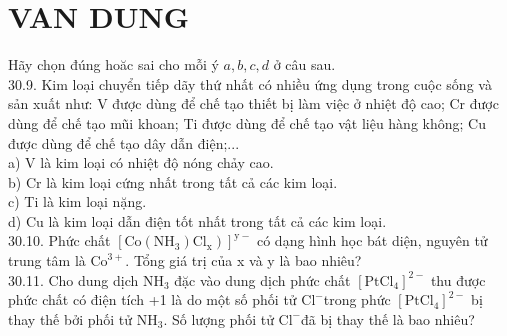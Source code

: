 \documentclass[10pt]{article}
\begin{document}
\section*{VAN DUNG}
Hãy chọn đúng hoăc sai cho mỗi ý $a, b, c, d$ ở câu sau.\\
30.9. Kim loại chuyển tiếp dãy thứ nhất có nhiều ứng dụng trong cuộc sống và sản xuất như: V được dùng để chế tạo thiết bị làm việc ở nhiệt độ cao; Cr được dùng để chế tạo mũi khoan; Ti được dùng để chế tạo vật liệu hàng không; Cu được dùng để chế tạo dây dẫn điện;...\\
a) V là kim loại có nhiệt độ nóng chảy cao.\\
b) Cr là kim loại cứng nhất trong tất cả các kim loại.\\
c) Ti là kim loại nặng.\\
d) Cu là kim loại dẫn điện tốt nhất trong tất cả các kim loại.\\
30.10. Phức chất $\left.\left[\mathrm{Co}\left(\mathrm{NH}_{3}\right) \mathrm{Cl}_{\mathrm{x}}\right)\right]^{\mathrm{y}-}$ có dạng hình học bát diện, nguyên tử trung tâm là $\mathrm{Co}^{3+}$. Tổng giá trị của x và y là bao nhiêu?\\
30.11. Cho dung dịch $\mathrm{NH}_{3}$ đặc vào dung dịch phức chất $\left[\mathrm{PtCl}_{4}\right]^{2-}$ thu được phức chất có điện tích +1 là do một số phối tử $\mathrm{Cl}^{-}$trong phức $\left[\mathrm{PtCl}_{4}\right]^{2-}$ bị thay thế bởi phối tử $\mathrm{NH}_{3}$. Số lượng phối tử $\mathrm{Cl}^{-}$đã bị thay thế là bao nhiêu?
\end{document}
